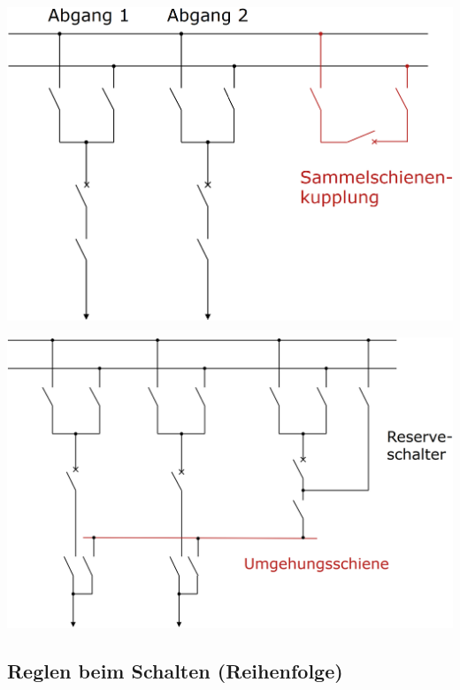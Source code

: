 \begin{minipage}[c]{0.48\columnwidth}
    \begin{center}
        \includegraphics[width=0.98\columnwidth]{images/Sammelscheinenkupplung.png}
    \end{center}
\end{minipage}
\hfill
\begin{minipage}[c]{0.48\columnwidth}
    \begin{center}
        \includegraphics[width=0.98\columnwidth]{images/Umgehungsschiene.png}
    \end{center}
\end{minipage}

\subsection{Reglen beim Schalten (Reihenfolge)}






